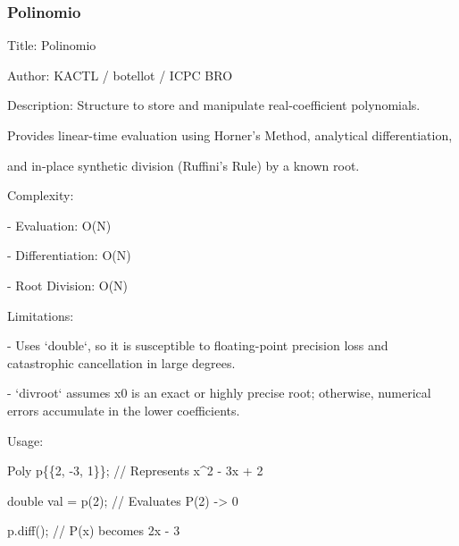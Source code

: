 \documentclass[10pt,landscape,twocolumn]{article}
\begin{document}
\subsubsection{Polinomio}
\begin{flushleft}
\footnotesize\ttfamily
\par\noindent Title: Polinomio
\par\noindent Author: KACTL / botellot / ICPC BRO
\par\noindent Description: Structure to store and manipulate real-coefficient polynomials.
\par\noindent Provides linear-time evaluation using Horner's Method, analytical differentiation,
\par\noindent and in-place synthetic division (Ruffini's Rule) by a known root.
\par\noindent Complexity:
\par\noindent - Evaluation: O(N)
\par\noindent - Differentiation: O(N)
\par\noindent - Root Division: O(N)
\par\noindent Limitations:
\par\noindent - Uses `double`, so it is susceptible to floating-point precision loss and catastrophic cancellation in large degrees.
\par\noindent - `divroot` assumes x0 is an exact or highly precise root; otherwise, numerical errors accumulate in the lower coefficients.
\par\noindent Usage:
\par\noindent Poly p\{\{2, -3, 1\}\}; // Represents x\textasciicircum{}2 - 3x + 2
\par\noindent double val = p(2);  // Evaluates P(2) -\textgreater{} 0
\par\noindent p.diff();           // P(x) becomes 2x - 3
\end{flushleft}
\end{document}
